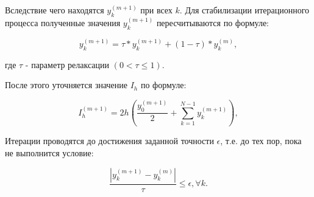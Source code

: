 \documentclass{article}
\begin{document}
Вследствие чего находятся $y_{k}^{(m+1)}$ при всех $k$. Для стабилизации итерационного процесса полученные значения $y_k^{(m+1)}$ пересчитываются по формуле:

\begin{equation}
    y_k^{(m+1)} =  \tau * y_k^{(m+1)} + (1 - \tau) * y_k^{(m)},
\end{equation}

\begin{center}
    где $\tau$ - параметр релаксации $(0 < \tau \leq 1).$    
\end{center}

После этого уточняется значение $I_h$ по формуле:

\begin{equation}
    I_h^{(m+1)} = 2h\left(\frac{y_0^{(m+1)}}{2} + \sum\limits_{k=1}^{N-1} y_k^{(m+1)}\right),
\end{equation}

Итерации проводятся до достижения заданной точности $\epsilon$, т.е. до тех пор, пока не выполнится условие:

\begin{equation}
    \frac{|y_k^{(m+1)} - y_k^{(m)}|}{\tau} \leq \epsilon, \forall k.
\end{equation}
\end{document}
